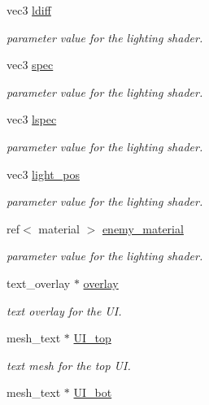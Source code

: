 \begin{DoxyCompactItemize}
vec3 \hyperlink{classoctet_1_1minecraft__wars_a8031b4e5055a0ae1a9ffe67a2cf4d168}{ldiff}
\begin{DoxyCompactList}\small\item\em parameter value for the lighting shader. \end{DoxyCompactList}\item 
vec3 \hyperlink{classoctet_1_1minecraft__wars_ab87766352cd67053cc6321ee3b50f0bd}{spec}
\begin{DoxyCompactList}\small\item\em parameter value for the lighting shader. \end{DoxyCompactList}\item 
vec3 \hyperlink{classoctet_1_1minecraft__wars_ae6f1a1adea97bff38101b79064781cea}{lspec}
\begin{DoxyCompactList}\small\item\em parameter value for the lighting shader. \end{DoxyCompactList}\item 
vec3 \hyperlink{classoctet_1_1minecraft__wars_adefdca5fc9d714ac66a152067de88899}{light\+\_\+pos}
\begin{DoxyCompactList}\small\item\em parameter value for the lighting shader. \end{DoxyCompactList}\item 
ref$<$ material $>$ \hyperlink{classoctet_1_1minecraft__wars_a4a9ebbe5825e5da5c6357718194e3d7e}{enemy\+\_\+material}
\begin{DoxyCompactList}\small\item\em parameter value for the lighting shader. \end{DoxyCompactList}\item 
text\+\_\+overlay $\ast$ \hyperlink{classoctet_1_1minecraft__wars_a91905856a8de4b1c973a89790ff17815}{overlay}
\begin{DoxyCompactList}\small\item\em text overlay for the U\+I. \end{DoxyCompactList}\item 
mesh\+\_\+text $\ast$ \hyperlink{classoctet_1_1minecraft__wars_aef4ef24e39d99f8c85f89869deebfd71}{U\+I\+\_\+top}
\begin{DoxyCompactList}\small\item\em text mesh for the top U\+I. \end{DoxyCompactList}\item 
mesh\+\_\+text $\ast$ \hyperlink{classoctet_1_1minecraft__wars_a8de450040dd8662f5743104bc8f54c71}{U\+I\+\_\+bot}

\end{DoxyCompactItemize}
